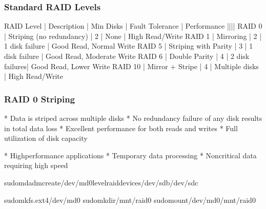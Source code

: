 \documentclass[letterpaper,10pt,english]{sphinxmanual}
\begin{document}
\subsubsection{Standard RAID Levels}
\label{\detokenize{raid-systems:standard-raid-levels}}
\begin{sphinxVerbatim}[commandchars=\\\{\}]
RAID Level    | Description              | Min Disks | Fault Tolerance | Performance
\PYGZhy{}\PYGZhy{}\PYGZhy{}\PYGZhy{}\PYGZhy{}\PYGZhy{}\PYGZhy{}\PYGZhy{}\PYGZhy{}\PYGZhy{}\PYGZhy{}\PYGZhy{}\PYGZhy{}\PYGZhy{}|\PYGZhy{}\PYGZhy{}\PYGZhy{}\PYGZhy{}\PYGZhy{}\PYGZhy{}\PYGZhy{}\PYGZhy{}\PYGZhy{}\PYGZhy{}\PYGZhy{}\PYGZhy{}\PYGZhy{}\PYGZhy{}\PYGZhy{}\PYGZhy{}\PYGZhy{}\PYGZhy{}\PYGZhy{}\PYGZhy{}\PYGZhy{}\PYGZhy{}\PYGZhy{}\PYGZhy{}\PYGZhy{}\PYGZhy{}|\PYGZhy{}\PYGZhy{}\PYGZhy{}\PYGZhy{}\PYGZhy{}\PYGZhy{}\PYGZhy{}\PYGZhy{}\PYGZhy{}\PYGZhy{}\PYGZhy{}|\PYGZhy{}\PYGZhy{}\PYGZhy{}\PYGZhy{}\PYGZhy{}\PYGZhy{}\PYGZhy{}\PYGZhy{}\PYGZhy{}\PYGZhy{}\PYGZhy{}\PYGZhy{}\PYGZhy{}\PYGZhy{}\PYGZhy{}\PYGZhy{}\PYGZhy{}|\PYGZhy{}\PYGZhy{}\PYGZhy{}\PYGZhy{}\PYGZhy{}\PYGZhy{}\PYGZhy{}\PYGZhy{}\PYGZhy{}\PYGZhy{}\PYGZhy{}\PYGZhy{}\PYGZhy{}
RAID 0        | Striping (no redundancy) | 2         | None           | High Read/Write
RAID 1        | Mirroring                | 2         | 1 disk failure | Good Read, Normal Write
RAID 5        | Striping with Parity     | 3         | 1 disk failure | Good Read, Moderate Write
RAID 6        | Double Parity           | 4         | 2 disk failures| Good Read, Lower Write
RAID 10       | Mirror + Stripe         | 4         | Multiple disks | High Read/Write
\end{sphinxVerbatim}


\subsubsection{RAID 0 \sphinxhyphen{} Striping}
\label{\detokenize{raid-systems:raid-0-striping}}
\sphinxAtStartPar
{}
* Data is striped across multiple disks
* No redundancy \sphinxhyphen{} failure of any disk results in total data loss
* Excellent performance for both reads and writes
* Full utilization of disk capacity

\sphinxAtStartPar
{}
* High\sphinxhyphen{}performance applications
* Temporary data processing
* Non\sphinxhyphen{}critical data requiring high speed

\begin{sphinxVerbatim}[commandchars=\\\{\}]
sudomdadm\PYGZhy{}\PYGZhy{}create/dev/md0\PYGZhy{}\PYGZhy{}level\PYGZhy{}\PYGZhy{}raid\PYGZhy{}devices/dev/sdb/dev/sdc

sudomkfs.ext4/dev/md0
sudomkdir/mnt/raid0
sudomount/dev/md0/mnt/raid0
\end{sphinxVerbatim}
\end{document}
